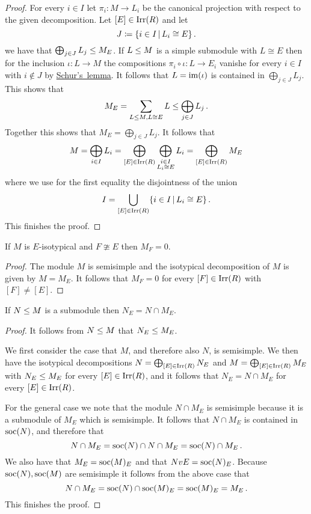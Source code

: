\begin{proof}
  For every $i \in I$ let $\pi_i \colon M \to L_i$ be the canonical projection with respect to the given decomposition.
  Let $[E] \in \operatorname{Irr}(R)$ and let
  \[
              J
    \defined  \{
                i \in I
              \suchthat
                L_i \cong E
              \} \,.
  \]
  we have that $\bigoplus_{j \in J} L_j \leq M_E$.
  If $L \leq M$ is a simple submodule with $L \cong E$ then for the inclusion $\iota \colon L \to M$ the compositions $\pi_i \circ \iota \colon L \to E_i$ vanishe for every $i \in I$ with $i \notin J$ by \hyperref[proposition: Schurs lemma for modules]{Schur’s~lemma}.
  It follows that $L = \operatorname{im}(\iota)$ is contained in $\bigoplus_{j \in J} L_j$.
  This shows that
  \[
              M_E
    =         \sum_{L \leq M, L \cong E} L
    \leq \bigoplus_{j \in J} L_j \,.
  \]
  Together this shows that $M_E = \bigoplus_{j \in J} L_j$.
  It follows that
  \[
      M
    = \bigoplus_{i \in I} L_i
    = \bigoplus_{[E] \in \operatorname{Irr}(R)} \bigoplus_{\substack{i \in I \\ L_i \cong E}} L_i
    = \bigoplus_{[E] \in \operatorname{Irr}(R)} M_E
  \]
  where we use for the first equality the disjointness of the union
  \[
                                I
    = \bigcup_{[E] \in \Irr(R)} \{ i \in I \suchthat L_i \cong E \} \,.
  \]
  This finishes the proof.
\end{proof}


\begin{corollary}
  If $M$ is $E$-isotypical and $F \ncong E$ then $M_F = 0$.
\end{corollary}


\begin{proof}
  The module $M$ is semisimple and the isotypical decomposition of $M$ is given by $M = M_E$.
  It follows that $M_F = 0$ for every $[F] \in \operatorname{Irr}(R)$ with $[F] \neq [E]$.
\end{proof}


\begin{lemma}
  If $N \leq M$ is a submodule then $N_E = N \cap M_E$.
\end{lemma}


\begin{proof}
  It follows from $N \leq M$ that $N_E \leq M_E$.
  
  We first consider the case that $M$, and therefore also $N$, is semisimple.
  We then have the isotypical decompositions $N = \bigoplus_{[E] \in \operatorname{Irr}(R)} N_E$ and $M = \bigoplus_{[E] \in \operatorname{Irr}(R)} M_E$ with $N_E \leq M_E$ for every $[E] \in \operatorname{Irr}(R)$, and it follows that $N_E = N \cap M_E$ for every $[E] \in \operatorname{Irr}(R)$.
  
  For the general case we note that the module $N \cap M_E$ is semisimple because it is a submodule of $M_E$ which is semisimple.
  It follows that $N \cap M_E$ is contained in $\operatorname{soc}(N)$, and therefore that
  \[
      N \cap M_E
    = \operatorname{soc}(N) \cap N \cap M_E
    = \operatorname{soc}(N) \cap M_E \,.
  \]
  We also have that $M_E = \operatorname{soc}(M)_E$ and that $NvE = \operatorname{soc}(N)_E$.
  Because $\operatorname{soc}(N), \operatorname{soc}(M)$ are semisimple it follows from the above case that
  \[
      N \cap M_E
    = \operatorname{soc}(N) \cap \operatorname{soc}(M)_E
    = \operatorname{soc}(M)_E
    = M_E \,.
  \]
  This finishes the proof.
\end{proof}


